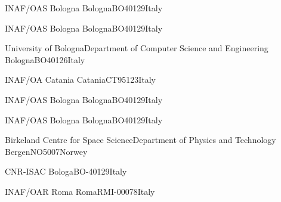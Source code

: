 \documentclass[11pt,twoside]{article}
\begin{document}
{INAF/OAS Bologna}{}
{Bologna}{BO}{40129}{Italy}

{INAF/OAS Bologna}{}
{Bologna}{BO}{40129}{Italy}

{University of Bologna}{Department of Computer Science and Engineering}
{Bologna}{BO}{40126}{Italy}

{INAF/OA Catania}{}
{Catania}{CT}{95123}{Italy}

{INAF/OAS Bologna}{}
{Bologna}{BO}{40129}{Italy}

{INAF/OAS Bologna}{}
{Bologna}{BO}{40129}{Italy}

{Birkeland Centre for Space Science}{Department of Physics and Technology}
{Bergen}{NO}{5007}{Norwey}

 {CNR-ISAC}
{Bologa}{BO}{-40129}{Italy}

 {INAF/OAR Roma}{}
{Roma}{RM}{I-00078}{Italy}



\begin{abstract}
The detection of Terrestrial Gamma-ray Flashes (TGFs) from CubeSat-class spacecraft presents significant challenges due to their sub-millisecond duration, the presence of backgrounds, and stringent onboard computational and power constraints. This work investigates a machine-learning-based approach for charged-particle background rejection in a compact, segmented gamma-ray detector designed for CubeSat-class missions. The detector consists of $500$ GAGG scintillator crystals, providing three-dimensional spatial and energy-deposition information. Monte Carlo simulations are performed using MEGAlib/Geant4 to model the response of the segmented GAGG detector to TGF photons and charged particles. A dedicated machine-learning classifier is developed to discriminate TGF photons from charged-particle backgrounds. %
Preliminary results, obtained without modelling atmospheric attenuation of TGF photons, demonstrate the potential of combining detector segmentation and machine-learning classification for future space-based TGF observations.
\end{abstract}
\end{document}
